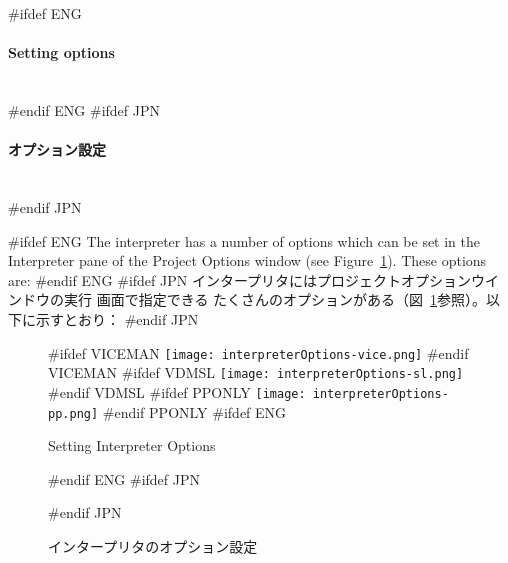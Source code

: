 \documentclass[\pformat,12pt]{article}
\newcommand{\subsubsubsection}[1]{\paragraph{#1}\mbox{}\\}
\newcommand{\guicmd}[1]{{\sf #1}}
\newcommand{\guicmd}[1]{{\gt #1}}
\begin{document}
#ifdef ENG
\subsubsubsection{Setting options}
#endif ENG
#ifdef JPN
\subsubsubsection{オプション設定}
#endif JPN


#ifdef ENG
The interpreter has a number of options which can be set in the 
\guicmd{Interpreter} pane of the \guicmd{Project Options} window (see
Figure~\ref{fig:optint}). These options are:
#endif ENG
#ifdef JPN
インタープリタには\guicmd{プロジェクトオプション}ウインドウの\guicmd{実行} 画面で指定できる
たくさんのオプションがある（図~\ref{fig:optint}参照）。以下に示すとおり：
#endif JPN

\begin{figure}[tbh]
\begin{center}
#ifdef VICEMAN
\texttt{[image: interpreterOptions-vice.png]}
#endif VICEMAN
#ifdef VDMSL
\texttt{[image: interpreterOptions-sl.png]}
#endif VDMSL
#ifdef PPONLY
\texttt{[image: interpreterOptions-pp.png]}
#endif PPONLY
#ifdef ENG
\caption{Setting Interpreter Options}
#endif ENG
#ifdef JPN
\caption{インタープリタのオプション設定}
#endif JPN
\label{fig:optint}
\end{center}
\end{figure}
\end{document}
